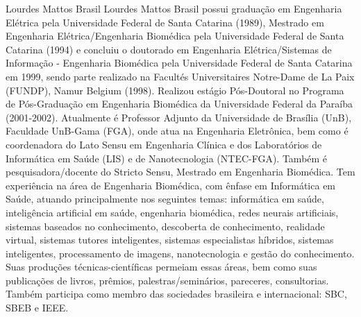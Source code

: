 \documentclass[journal]{IEEEtran}
\begin{document}
\begin{IEEEbiography}{Lourdes Mattos Brasil}
Lourdes Mattos Brasil possui graduação em Engenharia Elétrica pela Universidade Federal de Santa Catarina (1989), 
Mestrado em Engenharia Elétrica/Engenharia Biomédica pela Universidade Federal de Santa Catarina (1994) e 
concluiu o doutorado em Engenharia Elétrica/Sistemas de Informação - Engenharia Biomédica pela Universidade Federal de Santa Catarina em 1999, 
sendo parte realizado na Facultés Universitaires Notre-Dame de La Paix (FUNDP), Namur  Belgium (1998). 
Realizou estágio Pós-Doutoral no Programa de Pós-Graduação em Engenharia Biomédica da Universidade Federal da Paraíba (2001-2002). 
Atualmente é Professor Adjunto da Universidade de Brasília (UnB), 
Faculdade UnB-Gama (FGA), onde atua na Engenharia Eletrônica, 
bem como é coordenadora do Lato Sensu em Engenharia Clínica e dos Laboratórios de Informática em Saúde (LIS) e de Nanotecnologia (NTEC-FGA). 
Também é pesquisadora/docente do Stricto Sensu, Mestrado em Engenharia Biomédica. 
Tem experiência na área de Engenharia Biomédica, com ênfase em Informática em Saúde, atuando principalmente nos seguintes temas: 
informática em saúde, inteligência artificial em saúde, engenharia biomédica, redes neurais artificiais, sistemas baseados no conhecimento, descoberta de conhecimento, realidade virtual, sistemas tutores inteligentes, sistemas especialistas híbridos, sistemas inteligentes, processamento de imagens, nanotecnologia e gestão do conhecimento. 
Suas produções técnicas-científicas permeiam essas áreas, bem como suas publicações de livros, prêmios, palestras/seminários, pareceres, consultorias. 
Também participa como membro das sociedades brasileira e internacional: SBC, SBEB e IEEE.
\end{IEEEbiography}






\end{document}
